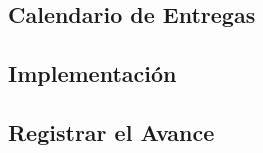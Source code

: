    


  \subsection{Calendario de Entregas}
  \label{subs:schedule_1}

    


\subsection{Implementación}
\label{sub:implementacion_iteracion_1}

    


\subsection{Registrar el Avance}
\label{sub:iteracion1_avance}

